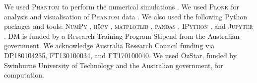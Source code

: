 \documentclass[fleqn,usenatbib]{mnras}
\begin{document}
We used \textsc{Phantom} to perform the numerical simulations
\citep{Price2018PASA...35...31P}. We used \textsc{Plonk} for analysis and
visualisation of \textsc{Phantom} data \citep{Mentiplay2019JOSS....4.1884M}. We
also used the following Python packages and tools: \textsc{NumPy}
\citep{Oliphant2006, van-der-Walt2011CSE....13b..22V}, \textsc{h5py}
\citep{Collette2013}, \textsc{matplotlib} \citep{Hunter2007CSE.....9...90H},
\textsc{pandas} \citep{McKinney2010}, \textsc{IPython}
\citep{Perez2007CSE.....9c..21P}, and \textsc{Jupyter} \citep{Kluyver2016}. DM
is funded by a Research Training Program Stipend from the Australian government.
We acknowledge Australia Research Council funding via DP180104235, FT130100034,
and FT170100040. We used OzStar, funded by Swinburne University of Technology
and the Australian government, for computation.
















\bsp %
\label{lastpage}
\end{document}
